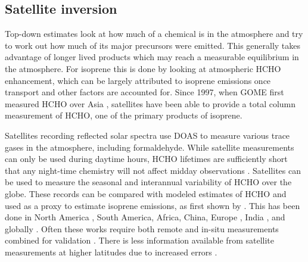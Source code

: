     
  
  \subsection{Satellite inversion}
  \label{BioIsop:SatInv}
  
    Top-down estimates look at how much of a chemical is in the atmosphere and try to work out how much of its major precursors were emitted.
    This generally takes advantage of longer lived products which may reach a measurable equilibrium in the atmosphere.
    For isoprene this is done by looking at atmospheric HCHO enhancement, which can be largely attributed to isoprene emissions once transport and other factors are accounted for.
    Since 1997, when GOME first measured HCHO over Asia \parencite{Thomas1998}, satellites have been able to provide a total column measurement of HCHO, one of the primary products of isoprene.
    
    Satellites recording reflected solar spectra use DOAS to measure various trace gases in the atmosphere, including formaldehyde. 
    While satellite measurements can only be used during daytime hours, HCHO lifetimes are sufficiently short that any night-time chemistry will not affect midday observations \parencite{Wolfe2016}.
    Satellites can be used to measure the seasonal and interannual variability of HCHO over the globe.
    These records can be compared with modeled estimates of HCHO and used as a proxy to estimate isoprene emissions, as first shown by \textcite{Palmer2001}.
    This has been done in North America \parencite{Palmer2003, Millet2006}, South America, Africa, China, Europe \parencite{Dufour2009}, India \parencite{Surl2018}, and globally \parencite{FortemsCheiney2012, Bauwens2016}.
    Often these works require both remote and in-situ measurements combined for validation \parencite{Marais2014}.
    There is less information available from satellite measurements at higher latitudes due to increased errors \parencite{DeSmedt2015}.
    
